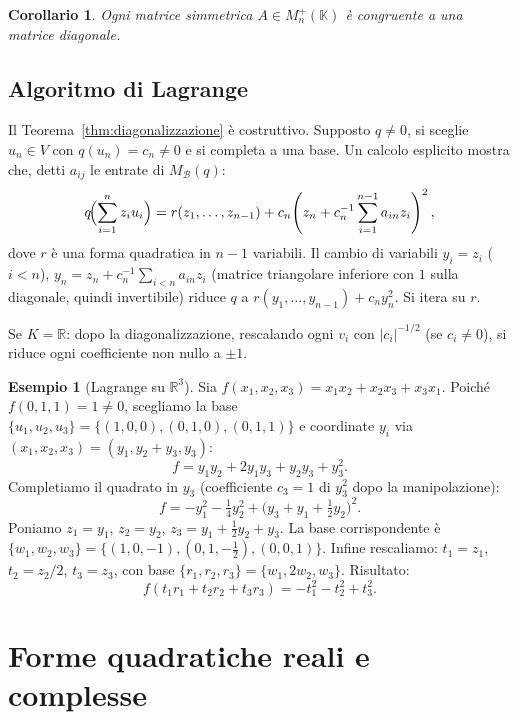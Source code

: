 \documentclass[11pt, a4paper]{book}
\theoremstyle{definition}
\newtheorem{esempio}[definizione]{Esempio}
\theoremstyle{plain}
\newtheorem{corollario}[definizione]{Corollario}
\theoremstyle{remark}
\newcommand{\R}{\mathbb{R}}
\newcommand{\K}{\mathbb{K}}
\begin{document}
\begin{corollario}
Ogni matrice simmetrica $A \in M_n^+(\K)$ è congruente a una matrice diagonale.
\end{corollario}

\subsection{Algoritmo di Lagrange}

Il Teorema~\ref{thm:diagonalizzazione} è costruttivo. Supposto $q \neq 0$, si sceglie $u_n \in V$ con $q(u_n) = c_n \neq 0$ e si completa a una base. Un calcolo esplicito mostra che, detti $a_{ij}$ le entrate di $M_\mathcal{B}(q)$:
\[
  q\!\Bigl(\sum_{i=1}^n z_i u_i\Bigr) = r(z_1,\ldots,z_{n-1}) + c_n\!\left(z_n + c_n^{-1}\sum_{i=1}^{n-1}a_{in}z_i\right)^2,
\]
dove $r$ è una forma quadratica in $n-1$ variabili. Il cambio di variabili $y_i = z_i$ ($i < n$), $y_n = z_n + c_n^{-1}\sum_{i<n}a_{in}z_i$ (matrice triangolare inferiore con $1$ sulla diagonale, quindi invertibile) riduce $q$ a $r(y_1,\ldots,y_{n-1}) + c_ny_n^2$. Si itera su $r$.

Se $K = \R$: dopo la diagonalizzazione, rescalando ogni $v_i$ con $|c_i|^{-1/2}$ (se $c_i \neq 0$), si riduce ogni coefficiente non nullo a $\pm 1$.

\begin{exbox}
\begin{esempio}[Lagrange su $\R^3$]
\label{es:lagrange}
Sia $f(x_1,x_2,x_3) = x_1x_2 + x_2x_3 + x_3x_1$. Poiché $f(0,1,1) = 1 \neq 0$, scegliamo la base $\{u_1,u_2,u_3\} = \{(1,0,0),(0,1,0),(0,1,1)\}$ e coordinate $y_i$ via $(x_1,x_2,x_3) = (y_1,y_2+y_3,y_3)$:
\[
  f = y_1y_2 + 2y_1y_3 + y_2y_3 + y_3^2.
\]
Completiamo il quadrato in $y_3$ (coefficiente $c_3 = 1$ di $y_3^2$ dopo la manipolazione):
\[
  f = -y_1^2 - \tfrac{1}{4}y_2^2 + \bigl(y_3+y_1+\tfrac{1}{2}y_2\bigr)^2.
\]
Poniamo $z_1 = y_1$, $z_2 = y_2$, $z_3 = y_1+\tfrac{1}{2}y_2+y_3$. La base corrispondente è $\{w_1,w_2,w_3\} = \{(1,0,-1),(0,1,-\tfrac{1}{2}),(0,0,1)\}$. Infine rescaliamo: $t_1 = z_1$, $t_2 = z_2/2$, $t_3 = z_3$, con base $\{r_1,r_2,r_3\} = \{w_1,2w_2,w_3\}$. Risultato:
\[
  f(t_1r_1+t_2r_2+t_3r_3) = -t_1^2 - t_2^2 + t_3^2.
\]
\end{esempio}
\end{exbox}

\section{Forme quadratiche reali e complesse}
\label{sec:forme-reali-complesse}
\end{document}
